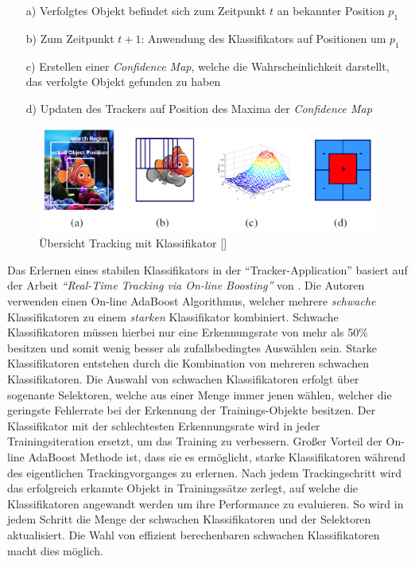 \begin{itemize}
    \item[a)] Verfolgtes Objekt befindet sich zum Zeitpunkt $t$ an bekannter Position $p_1$
    \item[b)] Zum Zeitpunkt $t+1$: Anwendung des Klassifikators auf Positionen um $p_1$
    \item[c)] Erstellen einer \textit{Confidence Map}, welche die Wahrscheinlichkeit darstellt,
                das verfolgte Objekt gefunden zu haben
    \item[d)] Updaten des Trackers auf Position des Maxima der \textit{Confidence Map}
\end{itemize}

\begin{figure}[H]
    \centering
    \includegraphics[width=0.7\linewidth]{../resources/img/grundlagen/tracking}
    \caption[Übersicht Tracking mit Klassifikator]{Übersicht Tracking mit Klassifikator [\cite{Grabner}]}
    \label{fig:grund_tracking}
\end{figure}

Das Erlernen eines stabilen Klassifikators in der ``Tracker-Application'' basiert auf der Arbeit
\textit{``Real-Time Tracking via On-line Boosting''} von \cite[]{Grabner}.
Die Autoren verwenden einen On-line AdaBoost Algorithmus, welcher mehrere \textit{schwache}
Klassifikatoren zu einem \textit{starken} Klassifikator kombiniert.
Schwache Klassifikatoren müssen hierbei nur eine Erkennungsrate von mehr als 50\% besitzen und somit
wenig besser als zufallsbedingtes Auswählen sein.
Starke Klassifikatoren entstehen durch die Kombination von mehreren schwachen Klassifikatoren.
Die Auswahl von schwachen Klassifikatoren erfolgt über sogenante Selektoren, welche aus einer Menge
immer jenen wählen, welcher die geringste Fehlerrate bei der Erkennung
der Trainings-Objekte besitzen. Der Klassifikator mit der schlechtesten Erkennungsrate wird in jeder
Trainingsiteration ersetzt, um das Training zu verbessern.
Großer Vorteil der On-line AdaBoost Methode ist, dass sie es ermöglicht, starke Klassifikatoren während des
eigentlichen Trackingvorganges zu erlernen. Nach jedem Trackingschritt wird das erfolgreich erkannte
Objekt in Trainingssätze zerlegt, auf welche die Klassifikatoren angewandt werden um ihre Performance zu evaluieren.
So wird in jedem Schritt die Menge der schwachen Klassifikatoren und der Selektoren aktualisiert. Die Wahl
von effizient berechenbaren schwachen Klassifikatoren macht dies möglich.

